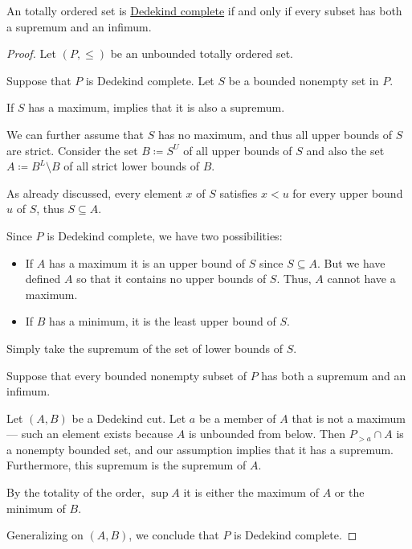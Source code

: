 \begin{proposition}\label{thm:dedekind_completeness_unbounded_characterization}
  An  totally ordered set is \hyperref[def:dedekind_completeness]{Dedekind complete} if and only if every   subset has both a supremum and an infimum.
\end{proposition}
\begin{proof}
  Let \( (P, \leq) \) be an unbounded totally ordered set.

  \SufficiencySubProof Suppose that \( P \) is Dedekind complete. Let \( S \) be a bounded nonempty set in \( P \).

   If \( S \) has a maximum,  implies that it is also a supremum.

  We can further assume that \( S \) has no maximum, and thus all upper bounds of \( S \) are strict. Consider the set \( B \coloneqq S^U \) of all upper bounds of \( S \) and also the set \( A \coloneqq B^L \setminus B \) of all strict lower bounds of \( B \).

  As already discussed, every element \( x \) of \( S \) satisfies \( x < u \) for every upper bound \( u \) of \( S \), thus \( S \subseteq A \).

  Since \( P \) is Dedekind complete, we have two possibilities:
  \begin{itemize}
    \item If \( A \) has a maximum it is an upper bound of \( S \) since \( S \subseteq A \). But we have defined \( A \) so that it contains no upper bounds of \( S \). Thus, \( A \) cannot have a maximum.

    \item If \( B \) has a minimum, it is the least upper bound of \( S \).
  \end{itemize}

   Simply take the supremum of the set of lower bounds of \( S \).

  \NecessitySubProof Suppose that every bounded nonempty subset of \( P \) has both a supremum and an infimum.

  Let \( (A, B) \) be a Dedekind cut. Let \( a \) be a member of \( A \) that is not a maximum --- such an element exists because \( A \) is unbounded from below. Then \( P_{>a} \cap A \) is a nonempty bounded set, and our assumption implies that it has a supremum. Furthermore, this supremum is the supremum of \( A \).

  By the totality of the order, \( \sup A \) it is either the maximum of \( A \) or the minimum of \( B \).

  Generalizing on \( (A, B) \), we conclude that \( P \) is Dedekind complete.
\end{proof}

